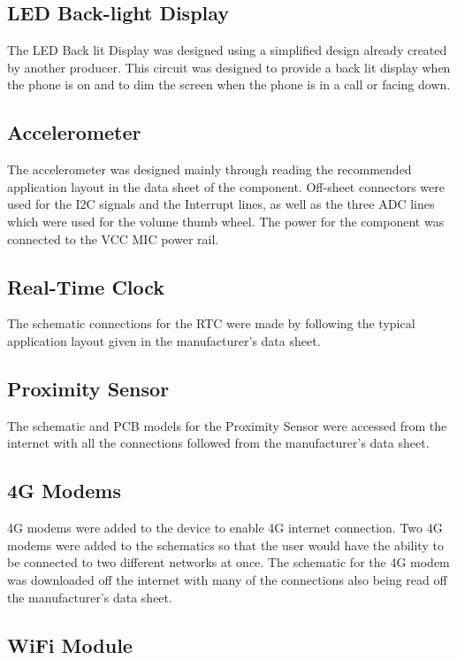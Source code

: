 \subsection{LED Back-light Display}

	The LED Back lit Display was designed using a simplified design already created by another producer. This circuit was designed to provide a back lit display when the phone is on and to dim the screen when the phone is in a call or facing down.

\subsection{Accelerometer}
\label{chap:a}
	The accelerometer was designed mainly through reading the recommended application layout in the data sheet of the component. Off-sheet connectors were used for the I2C signals and the Interrupt lines, as well as the three ADC lines which were used for the volume thumb wheel. The power for the component was connected to the VCC MIC power rail.

\subsection{Real-Time Clock}
\label{chap:RTC}
	The schematic connections for the RTC were made by following the typical application layout given in the manufacturer's data sheet.

\subsection{Proximity Sensor}
\label{chap:prox}
	The schematic and PCB models for the Proximity Sensor were accessed from the internet with all the connections followed from the manufacturer's data sheet. 

\subsection{4G Modems}
\label{chap:modem}
	4G modems were added to the device to enable 4G internet connection. Two 4G modems were added to the schematics so that the user would have the ability to be connected to two different networks at once.
The schematic for the 4G modem was downloaded off the internet with many of the connections also being read off the manufacturer's data sheet. 

\subsection{WiFi Module}

